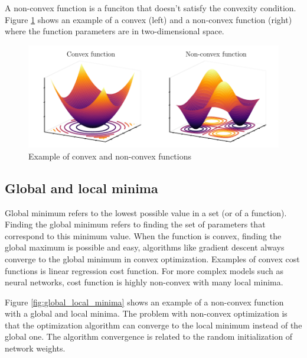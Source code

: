 A non-convex function is a funciton that doesn't satisfy the convexity condition. Figure \ref{fig:convex-nonconvex-functions} shows an example of a convex (left) and a non-convex function (right) where the function parameters are in two-dimensional space.

\begin{figure}[h]
    \centering
    \includegraphics{figures/gradient_descent.pdf}
    \caption{Example of convex and non-convex functions}
    \label{fig:convex-nonconvex-functions}
\end{figure}


\subsection{Global and local minima}
Global minimum refers to the lowest possible value in a set (or of a function). Finding the global minimum refers to finding the set of parameters that correspond to this minimum value. When the function is convex, finding the global maximum is possible and easy, algorithms like gradient descent always converge to the global minimum in convex optimization. Examples of convex cost functions is linear regression cost function. For more complex models such as neural networks, cost function is highly non-convex with many local minima.

Figure \ref{fig:global_local_minima} shows an example of a non-convex function with a global and local minima. The problem with non-convex optimization is that the optimization algorithm can converge to the local minimum instead of the global one. The algorithm convergence is related to the random initialization of network weights.

